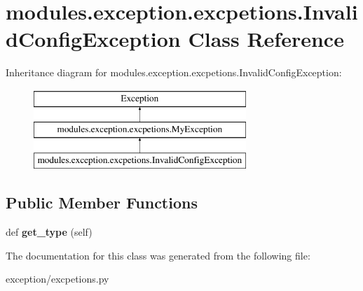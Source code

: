 \hypertarget{classmodules_1_1exception_1_1excpetions_1_1_invalid_config_exception}{}\section{modules.\+exception.\+excpetions.\+Invalid\+Config\+Exception Class Reference}
\label{classmodules_1_1exception_1_1excpetions_1_1_invalid_config_exception}
Inheritance diagram for modules.\+exception.\+excpetions.\+Invalid\+Config\+Exception\+:\begin{figure}[H]
\begin{center}
\leavevmode
\includegraphics[height=3.000000cm]{classmodules_1_1exception_1_1excpetions_1_1_invalid_config_exception}
\end{center}
\end{figure}
\subsection*{Public Member Functions}
\begin{DoxyCompactItemize}
\item 
\mbox{\label{classmodules_1_1exception_1_1excpetions_1_1_invalid_config_exception_a6b5f9b9d96dd7d710e9f2aa94f592472}} 
def {\bfseries get\+\_\+type} (self)
\end{DoxyCompactItemize}


The documentation for this class was generated from the following file\+:\begin{DoxyCompactItemize}
\item 
exception/excpetions.\+py\end{DoxyCompactItemize}
